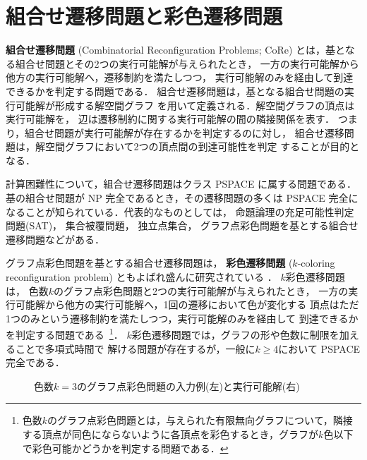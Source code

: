 \section{組合せ遷移問題と彩色遷移問題}\label{chap:background}

\textbf{組合せ遷移問題}
(Combinatorial Reconfiguration Problems;
CoRe\cite{core:ItoDHPSUU11,core:Nishimura18,core:Heuvel13})
とは，基となる組合せ問題とその2つの実行可能解が与えられたとき，
一方の実行可能解から他方の実行可能解へ，遷移制約を満たしつつ，
実行可能解のみを経由して到達できるかを判定する問題である．
組合せ遷移問題は，基となる組合せ問題の実行可能解が形成する解空間グラフ
を用いて定義される．解空間グラフの頂点は実行可能解を，
辺は遷移制約に関する実行可能解の間の隣接関係を表す．
つまり，組合せ問題が実行可能解が存在するかを判定するのに対し，
組合せ遷移問題は，解空間グラフにおいて2つの頂点間の到達可能性を判定
することが目的となる．

計算困難性について，組合せ遷移問題はクラス PSPACE に属する問題である．
基の組合せ問題が NP 完全であるとき，その遷移問題の多くは PSPACE 完全に
なることが知られている．代表的なものとしては，
命題論理の充足可能性判定問題(SAT)，
集合被覆問題，
独立点集合，
グラフ点彩色問題を基とする組合せ遷移問題などがある\cite{%
  core:gcp:BonsmaC09,%
  core:gcp:CerecedaHJ11,%
  core:sat:GopalanKMP09,%
  core:ItoDHPSUU11%
}．

グラフ点彩色問題を基とする組合せ遷移問題は，
\textbf{彩色遷移問題}
($k$-coloring reconfiguration problem)
ともよばれ盛んに研究されている%
\cite{core:gcp:BonsmaC09,core:gcp:CerecedaHJ11}．
$k$彩色遷移問題は，
色数$k$のグラフ点彩色問題と2つの実行可能解が与えられたとき，
一方の実行可能解から他方の実行可能解へ，1回の遷移において色が変化する
頂点はただ1つのみという遷移制約を満たしつつ，実行可能解のみを経由して
到達できるかを判定する問題である~\footnote{%
色数$k$のグラフ点彩色問題とは，与えられた有限無向グラフについて，隣接
する頂点が同色にならないように各頂点を彩色するとき，グラフが$k$色以下
で彩色可能かどうかを判定する問題である．}．
$k$彩色遷移問題では，グラフの形や色数に制限を加えることで多項式時間で
解ける問題が存在するが，一般に$k \ge 4$において PSPACE 完全である．

\begin{figure}[t]
  \centering
  \scalebox{0.7}{}
  \quad
  \scalebox{0.7}{}
  \caption{色数$k=3$のグラフ点彩色問題の入力例(左)と実行可能解(右)}
  \label{fig:graph}
\end{figure}

